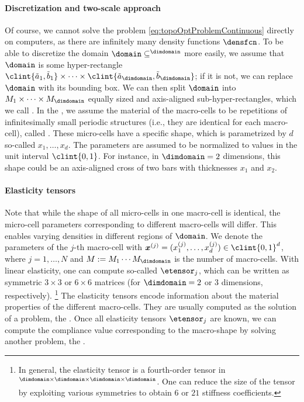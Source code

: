 \paragraph{Discretization and two-scale approach}

Of course, we cannot solve the problem \eqref{eq:topoOptProblemContinuous}
directly on computers,
as there are infinitely many density functions $\densfcn$.
To be able to discretize the domain $\domain \subset \real^{\dimdomain}$
more easily, we assume that $\domain$ is some hyper-rectangle
$\clint{\tilde{a}_1, \tilde{b}_1} \times \dotsb \times
\clint{\tilde{a}_{\dimdomain}, \tilde{b}_{\dimdomain}}$;
if it is not, we can replace $\domain$ with its bounding box.
We can then split $\domain$ into $M_1 \times \dotsb \times M_{\dimdomain}$
equally sized and axis-aligned sub-hyper-rectangles,
which we call .
In the ,
we assume the material of the macro-cells to be
repetitions of infinitesimally small periodic structures
(i.e., they are identical for each macro-cell),
called .
These micro-cells have a specific shape, which is parametrized by $d$ so-called
 $x_1, \dotsc, x_d$.
The parameters are assumed to be normalized to values in the
unit interval $\clint{0, 1}$.
For instance, in $\dimdomain = 2$ dimensions,
this shape could be an axis-aligned cross of two bars
with thicknesses $x_1$ and $x_2$.

\paragraph{Elasticity tensors}

Note that while the shape of all micro-cells in one macro-cell is identical,
the micro-cell parameters corresponding to different macro-cells will differ.
This enables varying densities in different regions of $\domain$.
We denote the parameters of the $j$-th macro-cell
with $\*x^{(j)} = (x_1^{(j)}, \dotsc, x_d^{(j)}) \in \clint{0, 1}^d$,
where $j = 1, \dotsc, N$ and
$M := M_1 \dotsm M_{\dimdomain}$ is the number of macro-cells.
With linear elasticity,
one can compute so-called  $\etensor_j$,
which can be written as
symmetric $3 \times 3$ or $6 \times 6$ matrices
(for $\dimdomain = 2$ or $3$ dimensions, respectively).%
\footnote{%
  In general, the elasticity tensor is a fourth-order tensor in
  $\real^{\dimdomain \times \dimdomain \times \dimdomain \times \dimdomain}$.
  One can reduce the size of the tensor by exploiting various symmetries
  \cite{Huebner14Mehrdimensionale}
  to obtain $6$ or $21$ stiffness coefficients.%
}
The elasticity tensors encode information about the material properties
of the different macro-cells.
They are usually computed as the solution of a \fem problem,
the .
Once all elasticity tensors $\etensor_j$ are known,
we can compute the compliance value corresponding to the macro-shape
by solving another \fem problem, the .

